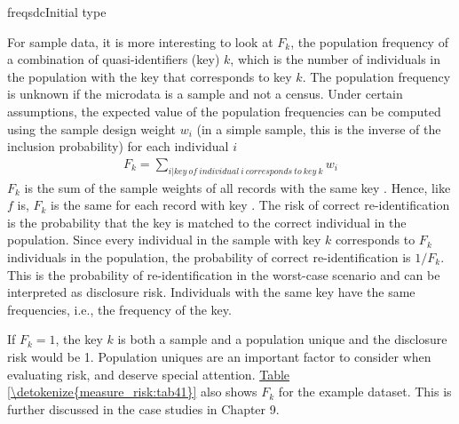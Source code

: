 \documentclass[letterpaper,10pt,english]{sphinxmanual}
\begin{document}
\def\sphinxLiteralBlockLabel{\label{\detokenize{measure_risk:code41}}}
%
\begin{sphinxVerbatim}[commandchars=\\\{\},numbers=left,firstnumber=1,stepnumber=1]
 freqsdcInitial type  
          
\end{sphinxVerbatim}

For sample data, it is more interesting to look at \(F_{k}\), the
population frequency of a combination of quasi-identifiers (key)
\(k\), which is the number of individuals in the population with the
key that corresponds to key \(k\). The population frequency
is unknown if the microdata is a sample and not a census. Under certain
assumptions, the expected value of the population frequencies can be
computed using the sample design weight \(w_{i}\) (in a simple
sample, this is the inverse of the inclusion probability) for each
individual \(i\)
\begin{equation*}
\begin{split}F_{k} = \sum_{i|key\ of\ individual\ i\ corresponds\ to\ key\ k}^{}w_{i}\end{split}
\end{equation*}
\(F_{k}\) is the sum of the sample weights of all records with the
same key . Hence, like \(f\) is, \(F_{k}\) is the same for
each record with key . The risk of correct re-identification is the
probability that the key is matched to the correct individual in the
population. Since every individual in the sample with key \(k\)
corresponds to \(F_{k}\) individuals in the population, the
probability of correct re-identification is \(1/F_{k}.\ \)This is
the probability of re-identification in the worst-case scenario and can
be interpreted as disclosure risk. Individuals with the same key have
the same frequencies, i.e., the frequency of the key.

If \(F_{k} = 1\), the key \(k\) is both a sample and a
population unique and the disclosure risk would be 1. Population uniques
are an important factor to consider when evaluating risk, and deserve
special attention. \hyperref[\detokenize{measure_risk:tab41}]{Table \ref{\detokenize{measure_risk:tab41}}} also shows \(F_{k}\) for the example
dataset. This is further discussed in the case studies in Chapter 9.
\end{document}
